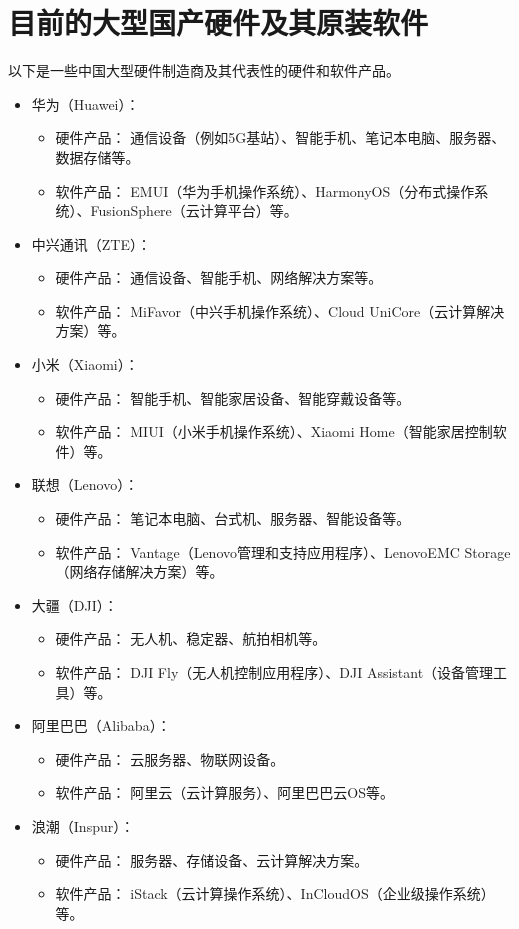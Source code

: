 \documentclass[11pt, a4paper, oneside]{ctexbook}
\begin{document}
\section{目前的大型国产硬件及其原装软件}
以下是一些中国大型硬件制造商及其代表性的硬件和软件产品。
\begin{itemize}
    \item 华为（Huawei）：
    \begin{itemize}
        \item 硬件产品： 通信设备（例如5G基站）、智能手机、笔记本电脑、服务器、数据存储等。
        \item 软件产品： EMUI（华为手机操作系统）、HarmonyOS（分布式操作系统）、FusionSphere（云计算平台）等。
    \end{itemize}
    \item 中兴通讯（ZTE）：
    \begin{itemize}
        \item 硬件产品： 通信设备、智能手机、网络解决方案等。
        \item 软件产品： MiFavor（中兴手机操作系统）、Cloud UniCore（云计算解决方案）等。
    \end{itemize}
    \item 小米（Xiaomi）：
    \begin{itemize}
        \item 硬件产品： 智能手机、智能家居设备、智能穿戴设备等。
        \item 软件产品： MIUI（小米手机操作系统）、Xiaomi Home（智能家居控制软件）等。
    \end{itemize}
    \item 联想（Lenovo）：
    \begin{itemize}
        \item 硬件产品： 笔记本电脑、台式机、服务器、智能设备等。
        \item 软件产品： Vantage（Lenovo管理和支持应用程序）、LenovoEMC Storage（网络存储解决方案）等。
    \end{itemize}
    \item 大疆（DJI）：
    \begin{itemize}
        \item 硬件产品： 无人机、稳定器、航拍相机等。
        \item 软件产品： DJI Fly（无人机控制应用程序）、DJI Assistant（设备管理工具）等。
    \end{itemize}
    \item 阿里巴巴（Alibaba）：
    \begin{itemize}
        \item 硬件产品： 云服务器、物联网设备。
        \item 软件产品： 阿里云（云计算服务）、阿里巴巴云OS等。
    \end{itemize}
    \item 浪潮（Inspur）：
    \begin{itemize}
        \item 硬件产品： 服务器、存储设备、云计算解决方案。
        \item 软件产品： iStack（云计算操作系统）、InCloudOS（企业级操作系统）等。
    \end{itemize}
\end{itemize}
\end{document}

